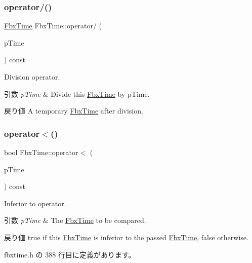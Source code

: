 \subsubsection{\texorpdfstring{operator/()}{operator/()}}
{\footnotesize\ttfamily \hyperlink{class_fbx_time}{Fbx\+Time} Fbx\+Time\+::operator/ (\begin{DoxyParamCaption}\item[{const \hyperlink{class_fbx_time}{Fbx\+Time} \&}]{p\+Time }\end{DoxyParamCaption}) const}

Division operator. 
\begin{DoxyParams}{引数}
{\em p\+Time} & Divide this \hyperlink{class_fbx_time}{Fbx\+Time} by p\+Time. \\
\hline
\end{DoxyParams}
\begin{DoxyReturn}{戻り値}
A temporary \hyperlink{class_fbx_time}{Fbx\+Time} after division. 
\end{DoxyReturn}
\mbox{\label{class_fbx_time_afb7a54c305cd31c35bb0d7f26a86b647}} 
\subsubsection{\texorpdfstring{operator$<$()}{operator<()}}
{\footnotesize\ttfamily bool Fbx\+Time\+::operator$<$ (\begin{DoxyParamCaption}\item[{const \hyperlink{class_fbx_time}{Fbx\+Time} \&}]{p\+Time }\end{DoxyParamCaption}) const\hspace{0.3cm}{\ttfamily [inline]}}

Inferior to operator. 
\begin{DoxyParams}{引数}
{\em p\+Time} & The \hyperlink{class_fbx_time}{Fbx\+Time} to be compared. \\
\hline
\end{DoxyParams}
\begin{DoxyReturn}{戻り値}
{\ttfamily true} if this \hyperlink{class_fbx_time}{Fbx\+Time} is inferior to the passed \hyperlink{class_fbx_time}{Fbx\+Time}, {\ttfamily false} otherwise. 
\end{DoxyReturn}


 fbxtime.\+h の 388 行目に定義があります。

\mbox{\label{class_fbx_time_a8d3937138e25178f4a4308e1d192620b}} 
